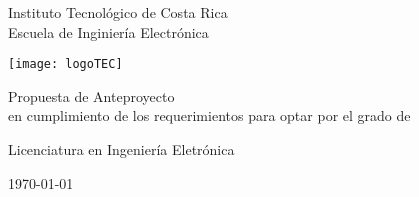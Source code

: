 
\thispagestyle{empty} 

\begin{center}

Instituto Tecnol\'ogico de Costa Rica \\
Escuela de Inginier\'ia Electr\'onica


\par\vspace{20mm}

\texttt{[image: logoTEC]}

\par\vspace*{\fill}

{\LARGE\bf{\textsf{\scriptTitle}}}

\par\vspace*{\fill}

{\sf Propuesta} de Anteproyecto \\ 
en cumplimiento de los requerimientos para optar por el grado de

Licenciatura en Ingenier\'ia Eletr\'onica \\

\par\vspace{20mm}

\scriptAuthor

\vspace*{\fill}

{\today}

\end{center}
\newpage 
\cleardoublepage  
